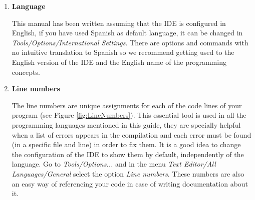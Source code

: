 \begin{enumerate}
	\item \textbf{Language}
	
	This manual has been written assuming that the IDE is configured in English, if you have used Spanish as default language, it can be changed in \textit{Tools/Options/International Settings}. There are options and commands with no intuitive translation to Spanish so we recommend getting used to the English version of the IDE and the English name of the programming concepts.
	
    
	\item \textbf{Line numbers} 
	
    The line numbers are unique assignments for each of the code lines of your program (see Figure \ref{fig:LineNumbers}). This essential tool is used in all the programming languages mentioned in this guide, they are specially helpful when a list of errors appears in the compilation and each error must be found (in a specific file and line) in order to fix them. It is a good idea to change the configuration of the IDE to show them by default, independently of the language. Go to \textit{Tools/Options...} and in the menu \textit{Text Editor/All Languages/General} select the option \textit{Line numbers}. These numbers are also an easy way of referencing your code in case of writing documentation about it. 
    

\end{enumerate}
